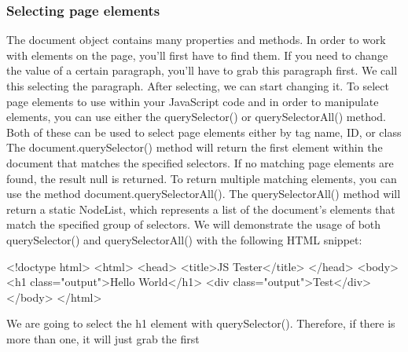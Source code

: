 \documentclass{report}
\begin{document}
    \subsubsection{Selecting page elements}
    \bigbreak \noindent 
    The document object contains many properties and methods. In order to work with elements on the page, you'll first have to find them. If you need to change the value of a certain paragraph, you'll have to grab this paragraph first. We call this selecting the paragraph. After selecting, we can start changing it.
    \bigbreak \noindent 
    To select page elements to use within your JavaScript code and in order to manipulate elements, you can use either the querySelector() or querySelectorAll() method. Both of these can be used to select page elements either by tag name, ID, or class
    \bigbreak \noindent 
    The document.querySelector() method will return the first element within the document that matches the specified selectors. If no matching page elements are found, the result null is returned. To return multiple matching elements, you can use the method document.querySelectorAll().
    \bigbreak \noindent 
    The querySelectorAll() method will return a static NodeList, which represents a list of the document's elements that match the specified group of selectors. We will demonstrate the usage of both querySelector() and querySelectorAll() with the following HTML snippet:
    \bigbreak \noindent 
    \begin{htmlcode}
        <!doctype html>
        <html>
            <head>
                <title>JS Tester</title>
            </head>
            <body>
                <h1 class="output">Hello World</h1>
                <div class="output">Test</div>
            </body>
        </html>
    \end{htmlcode}
    \bigbreak \noindent 
    We are going to select the h1 element with querySelector(). Therefore, if there is more than one, it will just grab the first
    \bigbreak \noindent 
\end{document}
